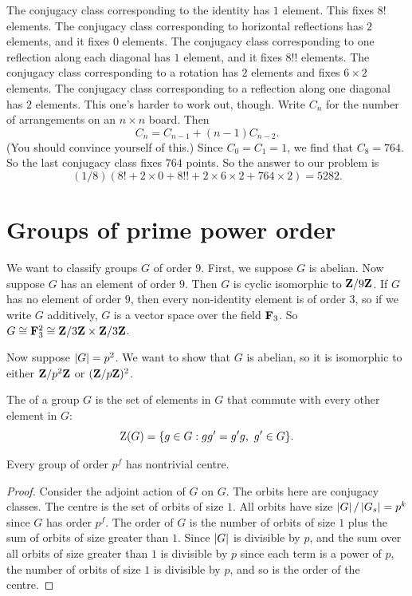 \documentclass[11pt, oneside]{amsart}
\begin{document}
The conjugacy class corresponding to the identity has $1$ element. This fixes $8!$ elements. The conjugacy class corresponding to horizontal reflections has $2$ elements, and it fixes $0$ elements. The conjugacy class corresponding to one reflection along each diagonal has $1$ element, and it fixes $8!!$ elements. The conjugacy class corresponding to a rotation has $2$ elements and fixes $6\times 2$ elements. The conjugacy class corresponding to a reflection along one diagonal has $2$ elements. This one's harder to work out, though. Write $C_n$ for the number of arrangements on an $n\times n$ board. Then 
$$
C_n = C_{n-1} + (n-1)C_{n-2}.
$$
(You should convince yourself of this.) Since $C_0=C_1=1$, we find that $C_8= 764$. So the last conjugacy class fixes $764$ points. So the answer to our problem is 
$$
(1/8){(8! + 2\times 0 + 8!! + 2\times 6\times 2 + 764\times 2 )}= 5282.
$$

\section{Groups of prime power order}
We want to classify groups $G$ of order $9$. First, we suppose $G$ is abelian. Now suppose $G$ has an element of order $9$. Then $G$ is cyclic isomorphic to $\mathbf Z / 9\mathbf Z$. If $G$ has no element of order $9$, then every non-identity element is of order $3$, so if we write $G$ additively, $G$ is a vector space over the field $\mathbf F_3$. So $G\cong \mathbf F_3^2 \cong \mathbf Z/3\mathbf Z \times \mathbf Z/3\mathbf Z$.

Now suppose $\left \lvert G \right \rvert = p^2$. We want to show that $G$ is abelian, so it is isomorphic to either $\mathbf Z/p^2\mathbf Z$ or $(\mathbf Z/p\mathbf Z)^2$. 
\begin{definition}
The  of a group $G$ is the set of elements in $G$ that commute with every other element in $G$:
$$
\operatorname{Z}(G) = \{ g\in G : gg' = g'g, \ g'\in G\}.
$$
\end{definition}

\begin{proposition}\label{yes}
Every group of order $p^f$ has nontrivial centre. 
\end{proposition}
\begin{proof}
Consider the adjoint action of $G$ on $G$. The orbits here are conjugacy classes. The centre is the set of orbits of size $1$. All orbits have size $\left \lvert G \right \rvert/\left \lvert G_s \right \rvert = p^k$ since $G$ has order $p^f$. The order of $G$ is the number of orbits of size $1$ plus the sum of orbits of size greater than $1$. Since $\left \lvert G \right \rvert$ is divisible by $p$, and the sum over all orbits of size greater than $1$ is divisible by $p$ since each term is a power of $p$, the number of orbits of size $1$ is divisible by $p$, and so is the order of the centre.  
\end{proof}
\end{document}
